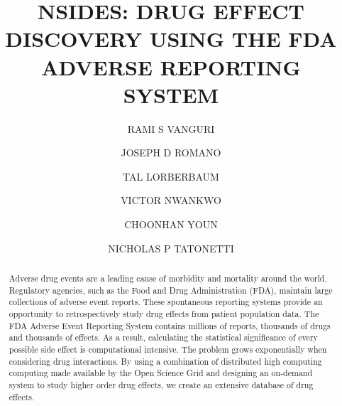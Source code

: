 \documentclass{ws-procs11x85}
\begin{document}
\title{NSIDES: DRUG EFFECT DISCOVERY USING THE FDA ADVERSE REPORTING SYSTEM}

\author{RAMI S VANGURI}

\address{Department of Biomedical Informatics, Columbia University,\\
New York, NY 10032 USA\\
E-mail: r.vanguri@columbia.edu}

\author{JOSEPH D ROMANO}

\address{Department of Biomedical Informatics, Columbia University,\\
New York, NY 10032 USA\\
E-mail: r.vanguri@columbia.edu}

\author{TAL LORBERBAUM}

\address{Department of Biomedical Informatics, Columbia University,\\
New York, NY 10032 USA\\
E-mail: r.vanguri@columbia.edu}

\author{VICTOR NWANKWO}

\address{Department of Biomedical Informatics, Columbia University,\\
New York, NY 10032 USA\\
E-mail: r.vanguri@columbia.edu}

\author{CHOONHAN YOUN}

\address{San Diego Supercomputer Center, University of California, San Diego,\\
La Jolla, CA 92093 USA\\
E-mail: cyoun@sdsc.edu}

\author{NICHOLAS P TATONETTI}

\address{Department of Biomedical Informatics, Columbia University,\\
New York, NY 10032 USA\\
E-mail: nick.tatonetti@columbia.edu}

\begin{abstract}
Adverse drug events are a leading cause of morbidity and mortality
around the world. Regulatory agencies, such as the Food and Drug
Administration (FDA), maintain large collections of adverse event
reports.  These spontaneous reporting systems provide an opportunity
to retrospectively study drug effects from patient population
data. The FDA Adverse Event Reporting System contains millions of
reports, thousands of drugs and thousands of effects.  As a result,
calculating the statistical significance of every possible side effect
is computational intensive.  The problem grows exponentially when
considering drug interactions. By using a combination of distributed
high computing computing made available by the Open Science Grid and
designing an on-demand system to study higher order drug effects, we
create an extensive database of drug effects.
\end{abstract}
\end{document}
